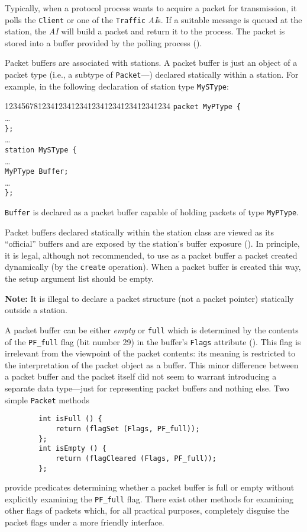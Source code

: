 Typically,
when a protocol process wants to acquire a packet for transmission, it
polls the {\tt Client} or one of the {\tt Traffic} {\em AI\/}s.
If a suitable message is queued at the station, the {\em AI\/} will
build a packet and return it to the process.
The packet is stored into a buffer provided by the polling process
().

Packet buffers are associated with stations.
A packet buffer is just an object of a packet type (i.e., a subtype of
{\tt Packet}---) declared statically within a
station.
For example, in the following declaration of station type {\tt MySType}:
{\tt\begin{tabbing}
12345678\=1234\=1234\=1234\=1234\=1234\=1234\=1234\=1234\kill
\> {\tt packet MyPType \{} \\
\> \> \ldots \\
\> {\tt \};} \\
\> \ldots \\
\> {\tt station MySType \{} \\
\> \> \ldots \\
\> \> {\tt MyPType Buffer; } \\
\> \> \ldots \\
\> {\tt \};}
\end{tabbing}}
\noindent
{\tt Buffer} is declared as a packet buffer capable of holding packets of type
{\tt MyPType}.

Packet buffers declared statically within the station class are viewed
as its ``official'' buffers and are exposed by the station's buffer
exposure ().
In principle, it is legal, although not
recommended, to use as a packet buffer a packet created
dynamically (by the {\tt create} operation).
When a packet buffer is created this way, the setup
argument list should be empty.

\medskip

\noindent
{\bf Note:} It is illegal to declare a packet structure (not a packet pointer)
statically outside a station.

\medskip

A packet buffer can be either {\em empty\/} or {\tt full} which is determined
by the contents of the {\tt PF\_full} flag (bit number 29)
in the buffer's {\tt Flags} attribute ().
This flag is irrelevant from the viewpoint of the packet contents: its
meaning is restricted to the interpretation of the packet object as a
buffer.
This minor difference between a packet buffer and the packet itself did not
seem to warrant introducing a separate data type---just for representing
packet buffers and nothing else.
Two simple {\tt Packet} methods
\begin{verbatim}
        int isFull () {
            return (flagSet (Flags, PF_full));
        };
        int isEmpty () {
            return (flagCleared (Flags, PF_full));
        };
\end{verbatim}
provide predicates determining whether a packet buffer is full or
empty without explicitly examining the {\tt PF\_full} flag.
There exist other methods for examining other flags of packets which, for
all practical purposes, completely disguise the packet flags under
a more friendly interface.


